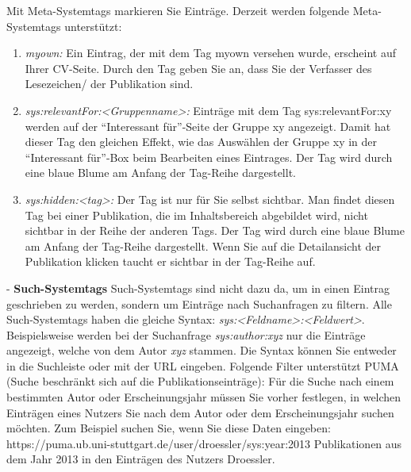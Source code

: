 \documentclass[b5paper,11pt,twoside]{scrbook} %
\begin{document}
Mit Meta-Systemtags markieren Sie Einträge. Derzeit werden folgende Meta-Systemtags unterstützt:
\begin{enumerate}
    \item \textit{myown:} Ein Eintrag, der mit dem Tag myown versehen wurde, erscheint auf Ihrer CV-Seite. Durch den Tag geben Sie an, dass Sie der Verfasser des Lesezeichen/ der Publikation sind.
    \item \textit{sys:relevantFor:<Gruppenname>:} Einträge mit dem Tag sys:relevantFor:xy werden auf der \enquote{Interessant für}-Seite der Gruppe xy angezeigt. Damit hat dieser Tag den gleichen Effekt, wie das  Auswählen der Gruppe xy in der \enquote{Interessant für}-Box beim Bearbeiten eines Eintrages. Der Tag wird durch eine blaue Blume am Anfang der Tag-Reihe dargestellt. 
    \item \textit{sys:hidden:<tag>:} Der Tag ist nur für Sie selbst sichtbar. Man findet diesen Tag bei einer Publikation, die im Inhaltsbereich abgebildet wird, nicht sichtbar in der Reihe der anderen Tags. Der Tag wird durch eine blaue Blume am Anfang der Tag-Reihe dargestellt. Wenn Sie auf die Detailansicht der Publikation klicken taucht er sichtbar in der Tag-Reihe auf.
\end{enumerate}
- \textbf{Such-Systemtags}\newline
Such-Systemtags sind nicht dazu da, um in einen Eintrag geschrieben zu werden, sondern um Einträge nach Suchanfragen zu filtern. Alle Such-Systemtags haben die gleiche Syntax: \textit{sys:<Feldname>:<Feldwert>}. Beispielsweise werden  bei der Suchanfrage \textit{sys:author:xyz} nur die Einträge angezeigt, welche von dem Autor \textit{xyz} stammen.\newline
Die Syntax können Sie entweder in die Suchleiste oder mit der URL eingeben. Folgende Filter unterstützt PUMA (Suche beschränkt sich auf die Publikationseinträge):\newline
\newline
Für die Suche nach einem bestimmten Autor oder Erscheinungsjahr müssen Sie vorher festlegen, in welchen Einträgen eines Nutzers Sie nach dem Autor oder dem Erscheinungsjahr suchen möchten. Zum Beispiel suchen Sie, wenn Sie diese Daten eingeben:  https://puma.ub.uni-stuttgart.de/user/droessler/sys:year:2013  Publikationen aus dem Jahr 2013 in den Einträgen des Nutzers Droessler. 
\end{document}
